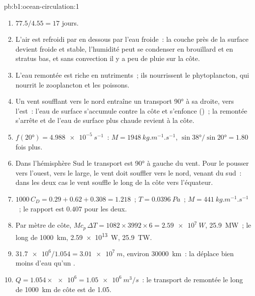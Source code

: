 \begin{solution}{pb:b1:ocean-circulation:1}
\begin{enumerate}
  \item $77.5/4.55 = 17$ jours.
  \item L'air est refroidi par en dessous par l'eau froide~: la couche près de la surface
        devient froide et stable, l'humidité peut se condenser en brouillard et en stratus bas,
        et sans convection il y a peu de pluie sur la côte.
  \item L'eau remontée est riche en nutriments~; ils nourrissent le phytoplancton, qui
        nourrit le zooplancton et les poissons.
  \item Un vent soufflant vers le nord entraîne un transport \ang{90} à sa droite, vers
        l'est~: l'eau de surface s'accumule contre la côte et s'enfonce ()~; la
        remontée s'arrête et de l'eau de surface plus chaude revient à la côte.
  \item $f(\ang{20}) = \qty{4.988e-5}{s^{-1}}$~: $M = \qty{1948}{kg.m^{-1}.s^{-1}}$,
        $\sin\ang{38}/\sin\ang{20} = 1.80$ fois plus.
  \item Dans l'hémisphère Sud le transport est \ang{90} à gauche du
        vent. Pour le pousser vers l'ouest, vers le large, le vent doit souffler vers le nord, venant du
        sud~: dans les deux cas le vent souffle le long de la côte vers l'équateur.
  \item $1000\,C_D = 0.29 + 0.62 + 0.308 = 1.218$~; $T = \qty{0.0396}{Pa}$~; $M =
        \qty{441}{kg.m^{-1}.s^{-1}}$~; le rapport est $0.407$ pour les deux.
  \item Par mètre de côte, $M c_p\,\Delta T = 1082 \times 3992 \times 6 =
        \qty{2.59e7}{W}$, \qty{25.9}{MW}~; le long de \qty{1000}{km}, \qty{2.59e13}{W},
        \qty{25.9}{TW}.
  \item $\num{31.7e6}/1.054 = \qty{3.01e7}{m}$, environ \qty{30000}{km}~: la  déplace bien moins d'eau qu'un .
  \item $Q = 1.054 \times \num{e6} = \qty{1.05e6}{m^3/s}$~: le transport de remontée
        le long de \qty{1000}{km} de côte est de \qty{1.05}{\sverdrup}.
\end{enumerate}
\end{solution}
